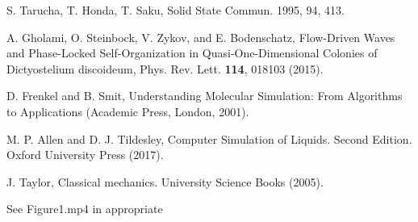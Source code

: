 \documentclass[twocolumn,preprintnumbers,amsmath,amssymb,aps,prx]{revtex4}
\begin{document}
\begin{thebibliography}{99}
      S. Tarucha, T. Honda,  T. Saku, Solid State Commun. 1995, 94, 413.

     A. Gholami, O. Steinbock, V. Zykov, and E. Bodenschatz, Flow-Driven Waves and Phase-Locked Self-Organization in Quasi-One-Dimensional Colonies of Dictyostelium discoideum, Phys. Rev. Lett. {\bf 114}, 018103 (2015).


     D. Frenkel and B. Smit, Understanding Molecular Simulation: From Algorithms to Applications (Academic Press, London, 2001).
      
     M. P. Allen and D. J. Tildesley, Computer Simulation of Liquids.  Second Edition. Oxford University Press (2017).

     J. Taylor,  Classical mechanics. University Science Books (2005).
      
 See Figure1.mp4 in appropriate %











\end{thebibliography}
\end{document}

